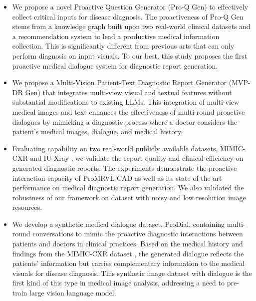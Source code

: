 \begin{itemize}
    \item We propose a novel Proactive Question Generator (Pro-Q Gen) to effectively collect critical inputs for disease diagnosis. The proactiveness of Pro-Q Gen stems from a knowledge graph built upon two real-world clinical datasets and a recommendation system to lead a productive medical information collection. This is significantly different from previous arts that can only perform diagnosis on input visuals. To our best, this study proposes the first proactive medical dialogue system for diagnostic report generation. 
    
    \item We propose a Multi-Vision Patient-Text Diagnostic Report Generator (MVP-DR Gen) that integrates multi-view visual and textual features without substantial modifications to existing LLMs. This integration of multi-view medical images and text enhances the effectiveness of multi-round proactive dialogues by mimicking a diagnostic process where a doctor considers the patient’s medical images, dialogue, and medical history. 

    \item Evaluating capability on two real-world publicly available datasets, MIMIC-CXR \cite{DBLP:journals/corr/abs-1901-07042} and IU-Xray \cite{DinaDemnerFushman.2015}, we validate the report quality and clinical efficiency on generated diagnostic reports. The experiments demonstrate the proactive interaction capacity of ProMRVL-CAD as well as its state-of-the-art performance on medical diagnostic report generation. We also validated the robustness of our framework on dataset with noisy and low resolution image resources.

    \item We develop a synthetic medical dialogue dataset, ProDial, containing multi-round conversations to mimic the proactive diagnostic interactions between patients and doctors in clinical practices. Based on the medical history and findings from the MIMIC-CXR dataset \cite{DBLP:journals/corr/abs-1901-07042}, the generated dialogue reflects the patients' information but carries complementary information to the medical visuals for disease diagnosis. This synthetic image dataset with dialogue is the first kind of this type in medical image analysis, addressing a need to pre-train large vision language model.   
    
\end{itemize}
